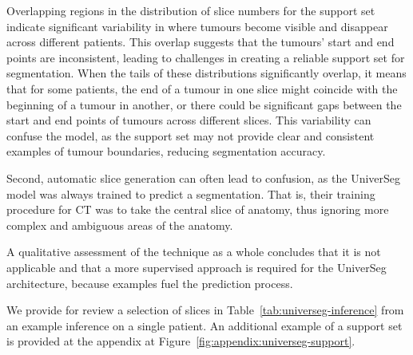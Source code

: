 \documentclass[12pt,twoside]{report}
\begin{document}

Overlapping regions in the distribution of slice numbers for the support set indicate significant variability in where tumours become visible and disappear across different patients. This overlap suggests that the tumours' start and end points are inconsistent, leading to challenges in creating a reliable support set for segmentation. When the tails of these distributions significantly overlap, it means that for some patients, the end of a tumour in one slice might coincide with the beginning of a tumour in another, or there could be significant gaps between the start and end points of tumours across different slices. This variability can confuse the model, as the support set may not provide clear and consistent examples of tumour boundaries, reducing segmentation accuracy. 

Second, automatic slice generation can often lead to confusion, as the UniverSeg model was always trained to predict a segmentation. That is, their training procedure for CT was to take the central slice of anatomy, thus ignoring more complex and ambiguous areas of the anatomy. 

A qualitative assessment of the technique as a whole concludes that it is not applicable and that a more supervised approach is required for the UniverSeg architecture, because examples fuel the prediction process.

We provide for review a selection of slices in Table~\ref{tab:universeg-inference} from an example inference on a single patient. An additional example of a support set is provided at the appendix at Figure~\ref{fig:appendix:universeg-support}. %

\end{document}

